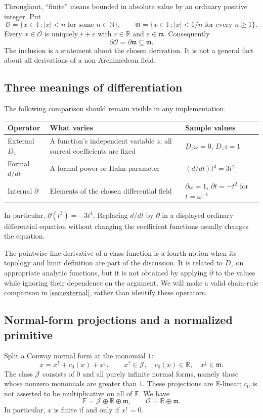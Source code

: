 \documentclass[11pt,a4paper]{article}
\numberwithin{equation}{section}
\theoremstyle{definition}
\theoremstyle{remark}
\newcommand{\F}{\mathbb F}
\newcommand{\R}{\mathbb R}
\newcommand{\N}{\mathbb N}
\newcommand{\OO}{\mathcal O}
\newcommand{\mm}{\mathfrak m}
\newcommand{\J}{\mathcal J}
\newcommand{\D}{\partial}
\newcommand{\up}[1]{#1^{\uparrow}}
\newcommand{\down}[1]{#1^{\downarrow}}
\newcommand{\abs}[1]{\lvert#1\rvert}
\begin{document}
Throughout, ``finite'' means bounded in absolute value by an ordinary
positive integer. Put
\[
 \OO=\{x\in\F:\abs x<n\text{ for some }n\in\N\},\qquad
 \mm=\{x\in\F:\abs x<1/n\text{ for every }n\geq1\}.
\]
Every $x\in\OO$ is uniquely $r+\varepsilon$ with $r\in\R$ and
$\varepsilon\in\mm$. Consequently
\begin{equation}\label{eq:Dfinite}
 \D\OO=\D\mm\subseteq\mm.
\end{equation}
The inclusion is a statement about the chosen derivation. It is not a general
fact about all derivations of a non-Archimedean field.

\subsection{Three meanings of differentiation}
The following comparison should remain visible in any implementation.
\begin{center}\small
\begin{tabularx}{\textwidth}{@{}P{0.21\textwidth}YY@{}}
\toprule
Operator & What varies & Sample values\\
\midrule
External $D_z$ & A function's independent variable $z$; all surreal
coefficients are fixed & $D_z\omega=0$, $D_z z=1$\\[0.35em]
Formal $d/dt$ & A formal power or Hahn parameter & $(d/dt)t^3=3t^2$\\[0.35em]
Internal $\D$ & Elements of the chosen differential field &
$\D\omega=1$, $\D t=-t^2$ for $t=\omega^{-1}$\\
\bottomrule
\end{tabularx}
\end{center}
In particular, $\D(t^3)=-3t^4$. Replacing $d/dt$ by $\D$ in a displayed
ordinary differential equation without changing the coefficient functions
usually changes the equation.

The pointwise fine derivative of a class function is a fourth notion when
its topology and limit definition are part of the discussion. It is related
to $D_z$ on appropriate analytic functions, but it is not obtained by
applying $\D$ to the values while ignoring their dependence on the argument.
We will make a valid chain-rule comparison in \cref{sec:external}, rather
than identify these operators.

\subsection{Normal-form projections and a normalized primitive}
Split a Conway normal form at the monomial $1$:
\begin{equation}\label{eq:split}
 x=\up{x}+c_0(x)+\down{x},
 \qquad \up{x}\in\J,\quad c_0(x)\in\R,\quad\down{x}\in\mm.
\end{equation}
The class $\J$ consists of $0$ and all purely infinite normal forms, namely
those whose nonzero monomials are greater than $1$. These projections are
$\R$-linear; $c_0$ is not asserted to be multiplicative on all of $\F$.
We have
\[
 \F=\J\oplus\R\oplus\mm,\qquad \OO=\R\oplus\mm.
\]
In particular, $x$ is finite if and only if $\up{x}=0$.
\end{document}
